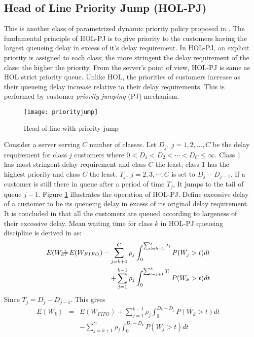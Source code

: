 \documentclass[a4paper,12pt]{article}
\begin{document}
\subsection{Head of Line Priority Jump (HOL-PJ)}
This is another class of parametrized dynamic priority policy proposed in \cite{holpj}. The fundamental principle of HOL-PJ is to give priority to the customers having the largest queueing delay in excess of it's delay requirement. In HOL-PJ, an explicit priority is assigned to each class; the more stringent the delay requirement of the class; the higher the priority. From the server's point of view, HOL-PJ is same as HOL strict priority queue.    Unlike HOL, the priorities of customers increase as their queueing delay increase relative to their delay requirements. This is performed by customer \textit{priority jumping} (PJ) mechanism.
\begin{figure}[htb!]
\centering
\texttt{[image: priorityjump]}
\caption{Head-of-line with priority jump \cite{holpj}}
\label{PriortyJump}
\end{figure}

Consider a server serving $C$ number of classes. Let $D_j,~j=1,2,\ldots,C$ be the delay requirement for class $j$ customers where $0<D_1<D_2<\cdots<D_C\leq \infty$. Class 1 has most stringent delay requirement and class $C$ the least; class 1 has the highest priority and class $C$ the least. $T_j,~j=2,3,\cdots, C$ is set to $D_j - D_{j-1}$. If a customer is still there in queue after a period of time $T_j$, It jumps to the tail of queue $j-1$. Figure \ref{PriortyJump} illustrates the operation of HOL-PJ. Define excessive delay of a customer to be its queueing delay in excess of its original delay requirement. It is concluded in \cite{holpj} that all the customers are queued according to largeness of their excessive delay. Mean waiting time for class $k$ in HOL-PJ queueing discipline is derived in \cite{holpj} as:
\begin{eqnarray}\nonumber
E(W_k)\hspace{-0,12in} &=&\hspace{-0,12in} E(W_{FIFO}) - \sum_{j =k+1}^C \rho_j \int_0^{\sum_{l = k+1}^jT_l}P(W_j > t)dt \\
&&+ \sum_{j=1}^{k-1}\rho_j\int_{0}^{\sum_{l = j+1}^k T_l}P(W_k > t)dt
\end{eqnarray}
Since $T_j = D_j -D_{j-1}$. This gives 
\begin{eqnarray}\nonumber
E(W_k)& =& E(W_{FIFO}) + \sum_{j=1}^{k-1}\rho_j\int_{0}^{D_k - D_j}P(W_k > t)dt\\\label{eqn:holpj_recursion}
&& - \sum_{j =k+1}^C \rho_j \int_0^{D_j-D_k}P(W_j > t)dt
\end{eqnarray}
\end{document}
